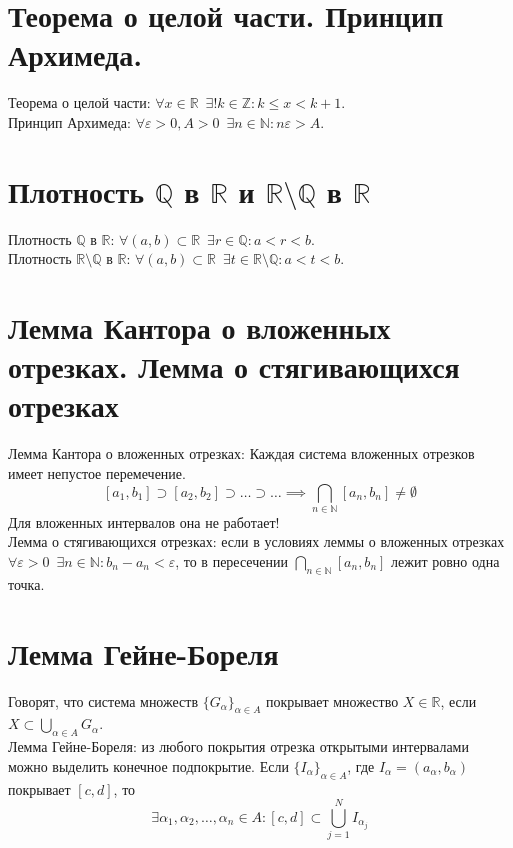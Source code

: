 \documentclass[11pt, a4paper, utf-8]{article}
\def\R{\mathbb{R}}
\def\Q{\mathbb{Q}}
\def\Z{\mathbb{Z}}
\def\N{\mathbb{N}}
\def\sp{\, \, \,}
\def\ds{\displaystyle}
\begin{document}
    \section{Теорема о целой части. Принцип Архимеда.}
    Теорема о целой части: $\forall x \in \R \sp \exists ! k \in \Z: k \leq x < k+1$.\\
    Принцип Архимеда: $\forall \varepsilon > 0 , A > 0 \sp \exists n \in \N : n\varepsilon > A$.

    \section{Плотность $\Q$ в $\R$ и $\R \setminus \Q$ в $\R$}
    Плотность $\Q$ в $\R$: $\forall (a,b) \subset \R \sp \exists r \in \Q: a < r < b$.\\
    Плотность $\R \setminus \Q$ в $\R$: $\forall (a,b) \subset \R \sp \exists t \in \R \setminus \Q : a < t < b$.

    \section{Лемма Кантора о вложенных отрезках. Лемма о стягивающихся отрезках}
    Лемма Кантора о вложенных отрезках: Каждая система вложенных отрезков имеет непустое перемечение.
    $$ [a_1, b_1] \supset [a_2, b_2] \supset \ldots \supset \ldots \implies \bigcap_{n \in \N} [a_n, b_n] \neq \emptyset$$
    Для вложенных интервалов она не работает!\\
    Лемма о стягивающихся отрезках: если в условиях леммы о вложенных отрезках\\$\forall \varepsilon > 0 \sp \exists n \in \N : b_n - a_n < \varepsilon$, то в пересечении $\ds \bigcap_{n \in \N} [a_n,b_n]$ лежит ровно одна точка.

    \section{Лемма Гейне-Бореля}
    Говорят, что система множеств $\{G_{\alpha}\}_{\alpha \in A}$ покрывает множество $X \in \R$, если $\ds X \subset \bigcup_{\alpha \in A} G_{\alpha}$.\\
    Лемма Гейне-Бореля: из любого покрытия отрезка открытыми интервалами можно выделить конечное подпокрытие. Если $\{I_{\alpha}\}_{\alpha \in A}$, где $I_\alpha = (a_{\alpha}, b_{\alpha})$ покрывает $[c, d]$, то
    $$\exists \alpha_1, \alpha_2, \ldots, \alpha_n \in A: [c,d] \subset \bigcup_{j=1}^N I_{\alpha_j}$$
\end{document}
